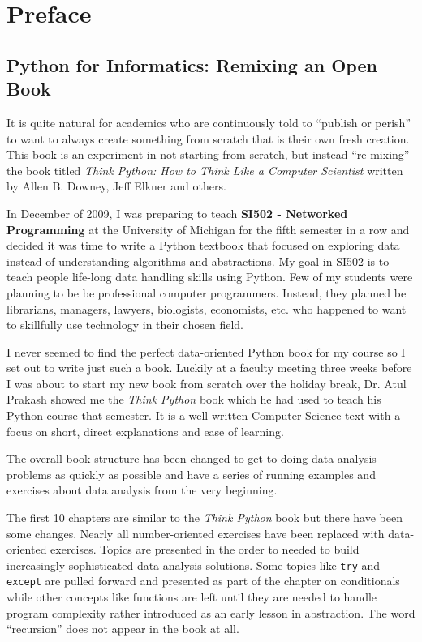 \documentclass[10pt]{book}
\begin{document}
\chapter{Preface}

\section*{Python for Informatics: Remixing an Open Book}

It is quite natural for academics who are continuously told to 
``publish or perish'' to want to always create something from scratch
that is their own fresh creation.   This book is an 
experiment in not starting from scratch, but instead ``re-mixing''
the book titled
\emph{Think Python: How to Think Like
a Computer Scientist}
written by Allen B. Downey, Jeff Elkner and others.

In December of 2009, I was preparing to teach
{\bf SI502 - Networked Programming} at the University of Michigan
for the fifth semester in a row and decided it was time
to write a Python textbook that focused on exploring data
instead of understanding algorithms and abstractions.
My goal in SI502 is to teach people life-long data handling 
skills using Python.  Few of my
students were planning to be be professional 
computer programmers.  Instead, they
planned be librarians, managers, lawyers, biologists, economists, etc. 
who happened to want to skillfully use technology in their chosen field.

I never seemed to find the perfect data-oriented Python
book for my course so I set out 
to write just such a book.  Luckily at a faculty meeting three weeks
before I was about to start my new book from scratch over 
the holiday break, 
Dr. Atul Prakash showed me the \emph{Think Python} book which he had
used to teach his Python course that semester.  
It is a well-written Computer Science text with a focus on 
short, direct explanations and ease of learning.  

The overall book structure
has been changed to get to doing data analysis problems as quickly as
possible and have a series of running examples and exercises 
about data analysis from the very beginning.  

The first 10 chapters are similar to the \emph{Think Python} book
but there have been some changes.  Nearly all number-oriented
exercises have been replaced with data-oriented exercises.
Topics are presented in the order to needed to build increasingly
sophisticated data analysis solutions.  Some topics like {\tt try} and
{\tt except} are pulled forward and presented as part of the chapter
on conditionals while other concepts like functions are left until 
they are needed to handle program complexity rather introduced 
as an early lesson in abstraction.  The word ``recursion'' does not 
appear in the book at all.
\end{document}
